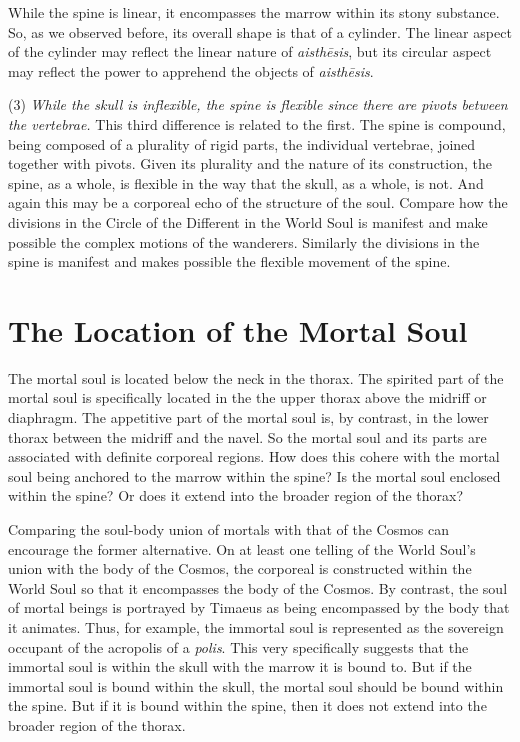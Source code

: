 While the spine is linear, it encompasses the marrow within its stony substance. So, as we observed before, its overall shape is that of a cylinder. The linear aspect of the cylinder may reflect the linear nature of \emph{aisthēsis}, but its circular aspect may reflect the power to apprehend the objects of \emph{aisthēsis}.

(3) \emph{While the skull is inflexible, the spine is flexible since there are pivots between the vertebrae.} This third difference is related to the first. The spine is compound, being composed of a plurality of rigid parts, the individual vertebrae, joined together with pivots. Given its plurality and the nature of its construction, the spine, as a whole, is flexible in the way that the skull, as a whole, is not. And again this may be a corporeal echo of the structure of the soul. Compare how the divisions in the Circle of the Different in the World Soul is manifest and make possible the complex motions of the wanderers. Similarly the divisions in the spine is manifest and makes possible the flexible movement of the spine. 



\section{The Location of the Mortal Soul} %
\label{sec:the_location_of_the_mortal_soul}

The mortal soul is located below the neck in the thorax. The spirited part of the mortal soul is specifically located in the the upper thorax above the midriff or diaphragm. The appetitive part of the mortal soul is, by contrast, in the lower thorax between the midriff and the navel. So the mortal soul and its parts are associated with definite corporeal regions. How does this cohere with the mortal soul being anchored to the marrow within the spine? Is the mortal soul enclosed within the spine? Or does it extend into the broader region of the thorax?

Comparing the soul-body union of mortals with that of the Cosmos can encourage the former alternative. On at least one telling of the World Soul's union with the body of the Cosmos, the corporeal is constructed within the World Soul so that it encompasses the body of the Cosmos. By contrast, the soul of mortal beings is portrayed by Timaeus as being encompassed by the body that it animates. Thus, for example, the immortal soul is represented as the sovereign occupant of the acropolis of a \emph{polis}. This very specifically suggests that the immortal soul is within the skull with the marrow it is bound to. But if the immortal soul is bound within the skull, the mortal soul should be bound within the spine. But if it is bound within the spine, then it does not extend into the broader region of the thorax.

